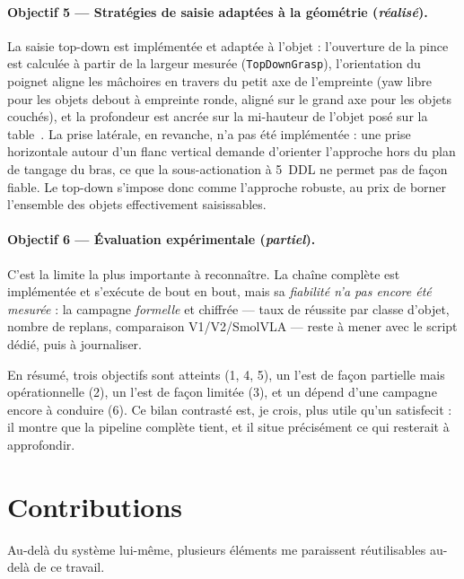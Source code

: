 \paragraph{Objectif 5 --- Stratégies de saisie adaptées à la géométrie
(\emph{réalisé}).} La saisie top-down est implémentée et adaptée à l'objet :
l'ouverture de la pince est calculée à partir de la largeur mesurée
(\texttt{TopDownGrasp}), l'orientation du poignet aligne les mâchoires en travers
du petit axe de l'empreinte (yaw libre pour les objets debout à empreinte ronde,
aligné sur le grand axe pour les objets couchés), et la profondeur est ancrée sur
la mi-hauteur de l'objet posé sur la table~\cite{bohg_data-driven_2014}.
La prise latérale, en revanche, n'a pas été implémentée : une prise horizontale
autour d'un flanc vertical demande d'orienter l'approche hors du plan de tangage
du bras, ce que la sous-actionation à 5~DDL ne permet pas de façon fiable. Le
top-down s'impose donc comme l'approche robuste, au prix de borner l'ensemble des
objets effectivement saisissables.

\paragraph{Objectif 6 --- Évaluation expérimentale (\emph{partiel}).} C'est la
limite la plus importante à reconnaître. La chaîne complète est implémentée et
s'exécute de bout en bout, mais sa \emph{fiabilité n'a pas encore été mesurée} :
la campagne \emph{formelle} et chiffrée --- taux de réussite par classe d'objet,
nombre de replans, comparaison V1/V2/SmolVLA --- reste à mener avec le script
dédié, puis à journaliser.

En résumé, trois objectifs sont atteints (1, 4, 5), un l'est de façon partielle
mais opérationnelle (2), un l'est de façon limitée (3), et un dépend d'une
campagne encore à conduire (6). Ce bilan contrasté est, je crois, plus utile
qu'un satisfecit : il montre que la pipeline complète tient, et il situe
précisément ce qui resterait à approfondir.

\section{Contributions}
\label{sec:concl_contributions}

Au-delà du système lui-même, plusieurs éléments me paraissent réutilisables
au-delà de ce travail.

